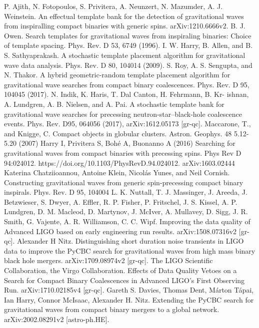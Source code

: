 \documentclass[binding=0.6cm, LaM]{sapthesis}
\begin{document}
\begin{thebibliography}{500}
	 P. Ajith, N. Fotopoulos, S. Privitera, A. Neunzert, N. Mazumder, A. J. Weinstein. An effectual template bank for the detection of gravitational waves from inspiralling compact binaries with generic spins. arXiv:1210.6666v2.
	 B. J. Owen. Search templates for gravitational waves from inspiraling binaries: Choice of template spacing. Phys. Rev. D 53, 6749 (1996). 
	 I. W. Harry, B. Allen, and B. S. Sathyaprakash. A stochastic template placement algorithm for gravitational wave data analysis. Phys. Rev. D 80, 104014 (2009).  
	 S. Roy, A. S. Sengupta, and N. Thakor. A hybrid geometric-random template placement algorithm for gravitational wave searches from compact binary coalescences. Phys. Rev. D 95, 104045 (2017). 
	 N. Indik, K. Haris, T. Dal Canton, H. Fehrmann, B. Kr- ishnan, A. Lundgren, A. B. Nielsen, and A. Pai. A stochastic template bank for gravitational wave searches for precessing neutron-star--black-hole coalescence events. Phys. Rev. D95, 064056 (2017), arXiv:1612.05173 [gr-qc].  
	 Maccarone, T., and Knigge, C. Compact objects in globular clusters. Astron. Geophys. 48 5.12- 5.20 (2007)
	 Harry I, Privitera S, Bohé A, Buonanno A (2016) Searching for gravitational waves from compact binaries with precessing spins. Phys Rev D 94:024012. https://doi.org/10.1103/PhysRevD.94.024012. arXiv:1603.02444
	 Katerina Chatziioannou, Antoine Klein, Nicolás Yunes, and Neil Cornish. Constructing gravitational waves from generic spin-precessing compact binary inspirals. Phys. Rev. D 95, 104004
	 L. K. Nuttall, T. J. Massinger, J. Areeda, J. Betzwieser, S. Dwyer, A. Effler, R. P. Fisher, P. Fritschel, J. S. Kissel, A. P. Lundgren, D. M. Macleod, D. Martynov, J. McIver, A. Mullavey, D. Sigg, J. R. Smith, G. Vajente, A. R. Williamson, C. C. Wipf. Improving the data quality of Advanced LIGO based on early engineering run results. arXiv:1508.07316v2 [gr-qc].
	 Alexander H Nitz. Distinguishing short duration noise transients in LIGO data to improve the PyCBC search for gravitational waves from high mass binary black hole mergers. arXiv:1709.08974v2 [gr-qc].
	 The LIGO Scientific Collaboration, the Virgo Collaboration. Effects of Data Quality Vetoes on a Search for Compact Binary Coalescences in Advanced LIGO's First Observing Run. arXiv:1710.02185v4 [gr-qc].
	 Gareth S. Davies, Thomas Dent, Márton Tápai, Ian Harry, Connor McIsaac, Alexander H. Nitz. Extending the PyCBC search for gravitational waves from compact binary mergers to a global network. arXiv:2002.08291v2 [astro-ph.HE].

\end{thebibliography}
\end{document}
